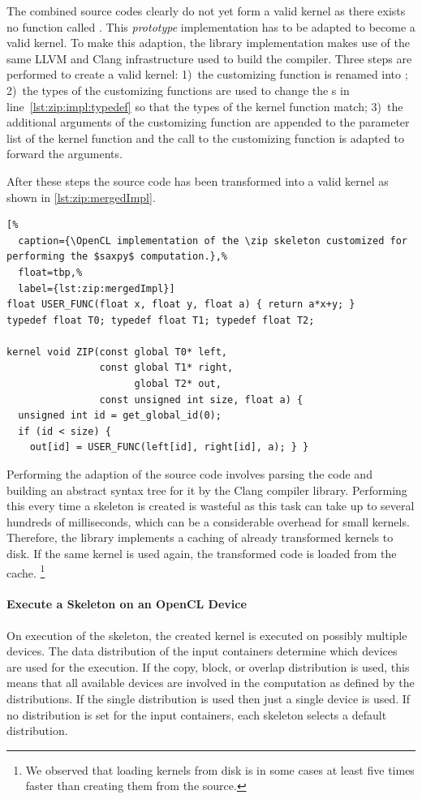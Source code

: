 The combined source codes clearly do not yet form a valid \OpenCL kernel as there exists no function called .
This \emph{prototype} implementation has to be adapted to become a valid \OpenCL kernel.
To make this adaption, the \SkelCL library implementation makes use of the same LLVM and Clang infrastructure used to build the  compiler.
Three steps are performed to create a valid \OpenCL kernel:
1)~the customizing function is renamed into ;
2)~the types of the customizing functions are used to change the s in line~\ref{lst:zip:impl:typedef} so that the types of the kernel function  match;
3)~the additional arguments of the customizing function are appended to the parameter list of the kernel function  and the call to the customizing function is adapted to forward the arguments.

After these steps the source code has been transformed into a valid \OpenCL kernel as shown in \autoref{lst:zip:mergedImpl}.
\begin{lstlisting}[%
  caption={\OpenCL implementation of the \zip skeleton customized for performing the $saxpy$ computation.},%
  float=tbp,%
  label={lst:zip:mergedImpl}]
float USER_FUNC(float x, float y, float a) { return a*x+y; }
typedef float T0; typedef float T1; typedef float T2;

kernel void ZIP(const global T0* left,
                const global T1* right,
                      global T2* out,
                const unsigned int size, float a) {
  unsigned int id = get_global_id(0);
  if (id < size) {
    out[id] = USER_FUNC(left[id], right[id], a); } }
\end{lstlisting}

Performing the adaption of the source code involves parsing the code and building an abstract syntax tree for it by the Clang compiler library.
Performing this every time a skeleton is created is wasteful as this task can take up to several hundreds of milliseconds, which can be a considerable overhead for small kernels.
Therefore, the \SkelCL library implements a caching of already transformed kernels to disk.
If the same kernel is used again, the transformed code is loaded from the cache.%
\footnote{We observed that loading kernels from disk is in some cases at least five times faster than creating them from the source.}


\paragraph{Execute a Skeleton on an OpenCL Device}
On execution of the skeleton, the created \OpenCL kernel is executed on possibly multiple \OpenCL devices.
The data distribution of the input containers determine which \OpenCL devices are used for the execution.
If the copy, block, or overlap distribution is used, this means that all available devices are involved in the computation as defined by the distributions.
If the single distribution is used then just a single device is used.
If no distribution is set for the input containers, each skeleton selects a default distribution.

